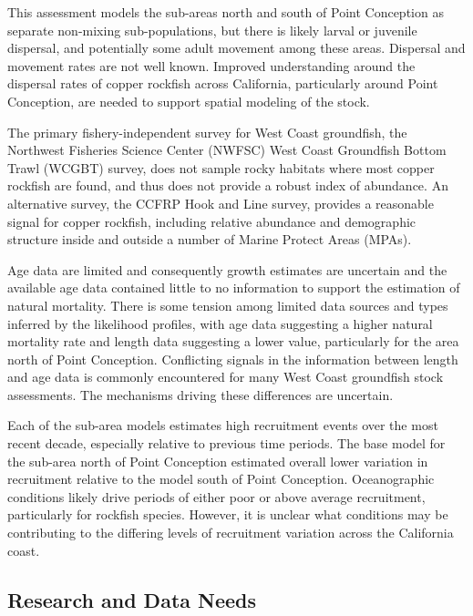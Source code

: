 \documentclass[11pt,
  english,
  letterpaper,
]{article}
\begin{document}
This assessment models the sub-areas north and south of Point Conception as separate non-mixing sub-populations, but there is likely larval or juvenile dispersal, and potentially some adult movement among these areas. Dispersal and movement rates are not well known. Improved understanding around the dispersal rates of copper rockfish across California, particularly around Point Conception, are needed to support spatial modeling of the stock.

The primary fishery-independent survey for West Coast groundfish, the Northwest Fisheries Science Center (NWFSC) West Coast Groundfish Bottom Trawl (WCGBT) survey, does not sample rocky habitats where most copper rockfish are found, and thus does not provide a robust index of abundance. An alternative survey, the CCFRP Hook and Line survey, provides a reasonable signal for copper rockfish, including relative abundance and demographic structure inside and outside a number of Marine Protect Areas (MPAs).

Age data are limited and consequently growth estimates are uncertain and the available age data contained little to no information to support the estimation of natural mortality. There is some tension among limited data sources and types inferred by the likelihood profiles, with age data suggesting a higher natural mortality rate and length data suggesting a lower value, particularly for the area north of Point Conception. Conflicting signals in the information between length and age data is commonly encountered for many West Coast groundfish stock assessments. The mechanisms driving these differences are uncertain.

Each of the sub-area models estimates high recruitment events over the most recent decade, especially relative to previous time periods. The base model for the sub-area north of Point Conception estimated overall lower variation in recruitment relative to the model south of Point Conception. Oceanographic conditions likely drive periods of either poor or above average recruitment, particularly for rockfish species. However, it is unclear what conditions may be contributing to the differing levels of recruitment variation across the California coast.

\hypertarget{research-and-data-needs-1}{%
\subsection{Research and Data Needs}\label{research-and-data-needs-1}}
\end{document}
